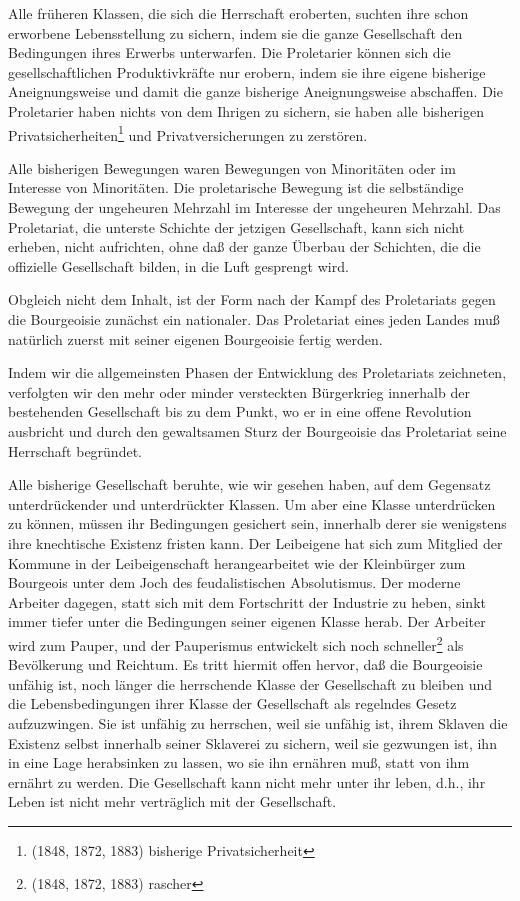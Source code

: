 \documentclass[letterpaper]{article}
\begin{document}
Alle früheren Klassen, die sich die Herrschaft eroberten, suchten ihre schon erworbene Lebensstellung zu sichern, indem sie die ganze Gesellschaft den Bedingungen ihres Erwerbs unterwarfen. Die Proletarier können sich die gesellschaftlichen Produktivkräfte nur erobern, indem sie ihre eigene bisherige Aneignungsweise und damit die ganze bisherige Aneignungsweise abschaffen. Die Proletarier haben nichts von dem Ihrigen zu sichern, sie haben alle bisherigen Privatsicherheiten\footnote{(1848, 1872, 1883) bisherige Privatsicherheit} und Privatversicherungen zu zerstören. 

Alle bisherigen Bewegungen waren Bewegungen von Minoritäten oder im Interesse von Minoritäten. Die proletarische Bewegung ist die selbständige Bewegung der ungeheuren Mehrzahl im Interesse der ungeheuren Mehrzahl. Das Proletariat, die unterste Schichte der jetzigen Gesellschaft, kann sich nicht erheben, nicht aufrichten, ohne daß der ganze Überbau der Schichten, die die offizielle Gesellschaft bilden, in die Luft gesprengt wird.

Obgleich nicht dem Inhalt, ist der Form nach der Kampf des Proletariats gegen die Bourgeoisie zunächst ein nationaler. Das Proletariat eines jeden Landes muß natürlich zuerst mit seiner eigenen Bourgeoisie fertig werden.

Indem wir die allgemeinsten Phasen der Entwicklung des Proletariats zeichneten, verfolgten wir den mehr oder minder versteckten Bürgerkrieg innerhalb der bestehenden Gesellschaft bis zu dem Punkt, wo er in eine offene Revolution ausbricht und durch den gewaltsamen Sturz der Bourgeoisie das Proletariat seine Herrschaft begründet.

Alle bisherige Gesellschaft beruhte, wie wir gesehen haben, auf dem Gegensatz unterdrückender und unterdrückter Klassen. Um aber eine Klasse unterdrücken zu können, müssen ihr Bedingungen gesichert sein, innerhalb derer sie wenigstens ihre knechtische Existenz fristen kann. Der Leibeigene hat sich zum Mitglied der Kommune in der Leibeigenschaft herangearbeitet wie der Kleinbürger zum Bourgeois unter dem Joch des feudalistischen Absolutismus. Der moderne Arbeiter dagegen, statt sich mit dem Fortschritt der Industrie zu heben, sinkt immer tiefer unter die Bedingungen seiner eigenen Klasse herab. Der Arbeiter wird zum Pauper, und der Pauperismus entwickelt sich noch schneller\footnote{(1848, 1872, 1883) rascher} als Bevölkerung und Reichtum. Es tritt hiermit offen hervor, daß die Bourgeoisie unfähig ist, noch länger die herrschende Klasse der Gesellschaft zu bleiben und die Lebensbedingungen ihrer Klasse der Gesellschaft als regelndes Gesetz aufzuzwingen. Sie ist unfähig zu herrschen, weil sie unfähig ist, ihrem Sklaven die Existenz selbst innerhalb seiner Sklaverei zu sichern, weil sie gezwungen ist, ihn in eine Lage herabsinken zu lassen, wo sie ihn ernähren muß, statt von ihm ernährt zu werden. Die Gesellschaft kann nicht mehr unter ihr leben, d.h., ihr Leben ist nicht mehr verträglich mit der Gesellschaft.
\end{document}
